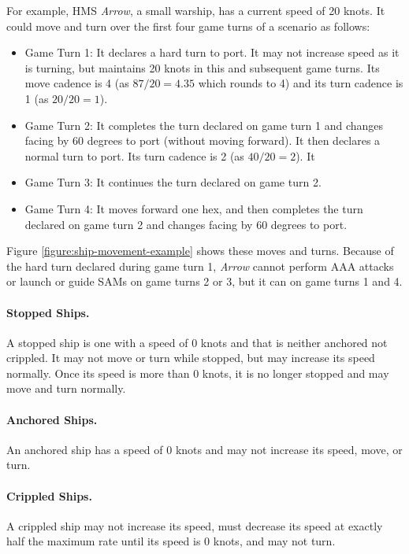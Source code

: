{For example, HMS {\itshape Arrow}, a small warship, has a current speed of 20 knots. It could move and turn over the first four game turns of a scenario as follows:
\begin{itemize}
\item Game Turn 1:  It declares a hard turn to port. It may not increase speed as it is turning, but maintains 20 knots in this and subsequent game turns. Its move cadence is 4 (as $87/20 = 4.35$ which rounds to 4) and its turn cadence is 1 (as $20/20 = 1$).
\item Game Turn 2: It completes the turn declared on game turn 1 and changes facing by 60 degrees to port (without moving forward). It then declares a normal turn to port. Its turn cadence is 2 (as $40/20 = 2$). It 
\item Game Turn 3: It continues the turn declared on game turn 2.
\item Game Turn 4: It moves forward one hex, and then completes the turn declared on game turn 2 and changes facing by 60 degrees to port.
\end{itemize}
Figure \ref{figure:ship-movement-example} shows these moves and turns. Because of the hard turn declared during game turn 1, {\itshape Arrow} cannot perform AAA attacks or launch or guide SAMs on game turns 2 or 3, but it can on game turns 1 and 4.


\paragraph{Stopped Ships.} A stopped ship is one with a speed of 0 knots and that is neither anchored not crippled. It may not move or turn while stopped, but may increase its speed normally. Once its speed is more than 0 knots, it is no longer stopped and may move and turn normally.

\paragraph{Anchored Ships.} An anchored ship has a speed of 0 knots and may not increase its speed, move, or turn.

\paragraph{Crippled Ships.} A crippled ship may not increase its speed, must decrease its speed at exactly half the maximum rate until its speed is 0 knots, and may not turn.

}

